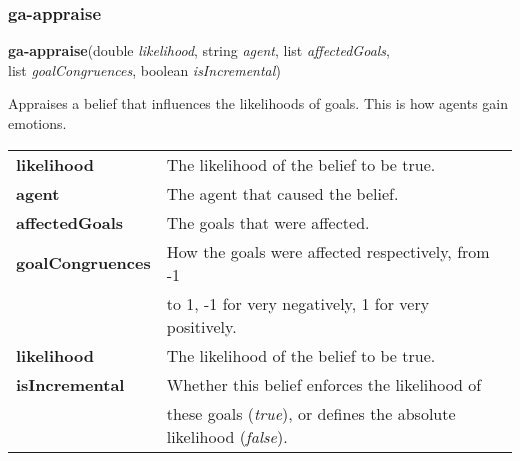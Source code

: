 \subsubsection{ga-appraise}

\textbf{ga-appraise}(double \emph{likelihood}, string \emph{agent}, list \emph{affectedGoals},\\list \emph{goalCongruences}, boolean \emph{isIncremental})

Appraises a belief that influences the likelihoods of goals. This is how agents gain emotions.\\

\begin{tabular}{l l}
	\textbf{likelihood} & The likelihood of the belief to be true.\\
	\textbf{agent} & The agent that caused the belief. \\
	\textbf{affectedGoals} & The goals that were affected.\\
	\textbf{goalCongruences} & How the goals were affected respectively, from -1\\ 
	& to 1, -1 for very negatively, 1 for very positively. \\
	\textbf{likelihood} & The likelihood of the belief to be true.\\
	\textbf{isIncremental} & Whether this belief enforces the likelihood of \\
	& these goals (\textit{true}), or defines the absolute likelihood (\textit{false}). 
\end{tabular}